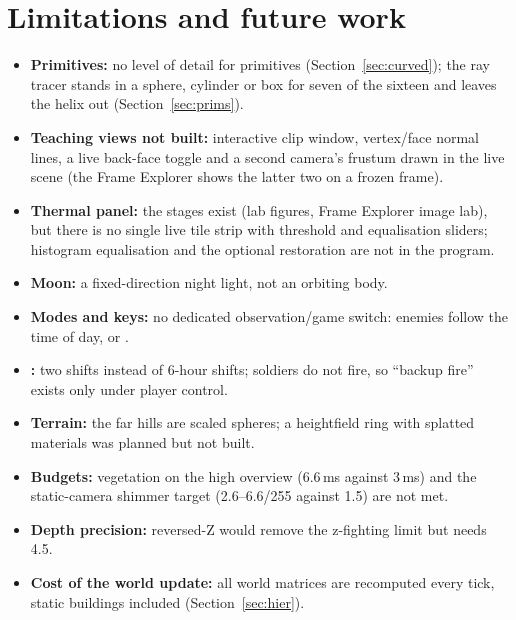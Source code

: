 \section{Limitations and future work}
\label{sec:limits}
\begin{itemize}
\item \textbf{Primitives:} no level of detail for primitives (Section~\ref{sec:curved}); the ray tracer stands in a
sphere, cylinder or box for seven of the sixteen and leaves the helix out (Section~\ref{sec:prims}).
\item \textbf{Teaching views not built:} interactive clip window, vertex/face normal lines, a live back-face toggle and a
second camera's frustum drawn in the live scene (the Frame Explorer shows the latter two on a frozen frame).
\item \textbf{Thermal panel:} the stages exist (lab figures, Frame Explorer image lab), but there is no single live
tile strip with threshold and equalisation sliders; histogram equalisation and the optional  restoration are not in the program.
\item \textbf{Moon:} a fixed-direction night light, not an orbiting body.
\item \textbf{Modes and keys:} no dedicated observation/game switch: enemies follow the time of day, or .
\item \textbf{:} two shifts instead of 6-hour shifts;  soldiers do not fire, so ``backup fire'' exists only under player control.
\item \textbf{Terrain:} the far hills are scaled spheres; a heightfield ring with splatted materials was planned but
not built.
\item \textbf{Budgets:} vegetation on the high overview (6.6\,ms against 3\,ms) and the static-camera shimmer target
(2.6--6.6/255 against 1.5) are not met.
\item \textbf{Depth precision:} reversed-Z would remove the z-fighting limit but needs  4.5.
\item \textbf{Cost of the world update:} all world matrices are recomputed every tick, static buildings included
(Section~\ref{sec:hier}).
\end{itemize}
